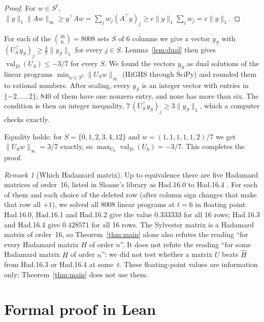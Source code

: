 \documentclass[11pt]{article}
\theoremstyle{remark}
\newtheorem{remark}{Remark}
\newcommand{\valD}{\operatorname{val}_D}
\newcommand{\Hh}{\hat H}
\begin{document}
\begin{proof}
For $w\in S^t$,
$\|y\|_1\|Aw\|_\infty\ge y^\top Aw=\sum_j w_j(A^\top y)_j\ge c\|y\|_1\sum_jw_j=c\|y\|_1$.
\end{proof}

For each of the $\binom{16}{6}=8008$ sets $S$ of 6 columns we give a vector $y_S$ with
$(U_S^\top y_S)_j\ge\frac37\|y_S\|_1$ for every $j\in S$. Lemma~\ref{lem:dual} then gives
$\valD(U_S)\le-3/7$ for every $S$. We found the vectors $y_S$ as dual solutions of the
linear programs $\min_{w\in S^6}\|U_Sw\|_\infty$ (HiGHS through SciPy) and rounded them to
rational numbers. After scaling, every $y_S$ is an integer vector with entries in
$\{-2,\dots,2\}$; 840 of them have one nonzero entry, and none has more than six. The
condition is then an integer inequality, $7\,(U_S^\top y_S)_j\ge3\|y_S\|_1$, which a
computer checks exactly.

Equality holds: for $S=\{0,1,2,3,4,12\}$ and $w=(1,1,1,1,1,2)/7$ we get
$\|U_Sw\|_\infty=3/7$ exactly, so $\max_{U_6}\valD(U_6)=-3/7$. This completes the proof.

\begin{remark}[Which Hadamard matrix]\label{rem:reading}
Up to equivalence there are five Hadamard matrices of order~16, listed in Sloane's library as
Had.16.0 to Had.16.4 \cite{sloane}. For each of them and each choice of the deleted row (after
column sign changes that make that row all $+1$), we solved all 8008 linear programs at
$t=6$ in floating point. Had.16.0, Had.16.1 and Had.16.2 give the value $0.333333$ for all
16 rows; Had.16.3 and Had.16.4 give $0.428571$ for all 16 rows. The Sylvester matrix is a
Hadamard matrix of order~16, so Theorem~\ref{thm:main} alone also refutes the reading
``for every Hadamard matrix $H$ of order $n$''. It does not refute the reading
``for some Hadamard matrix $H$ of order $n$'': we did not test whether a matrix $U$ beats
$\Hh$ from Had.16.3 or Had.16.4 at some~$t$. These floating-point values are information
only; Theorem~\ref{thm:main} does not use them.
\end{remark}

\section{Formal proof in Lean}
\end{document}
